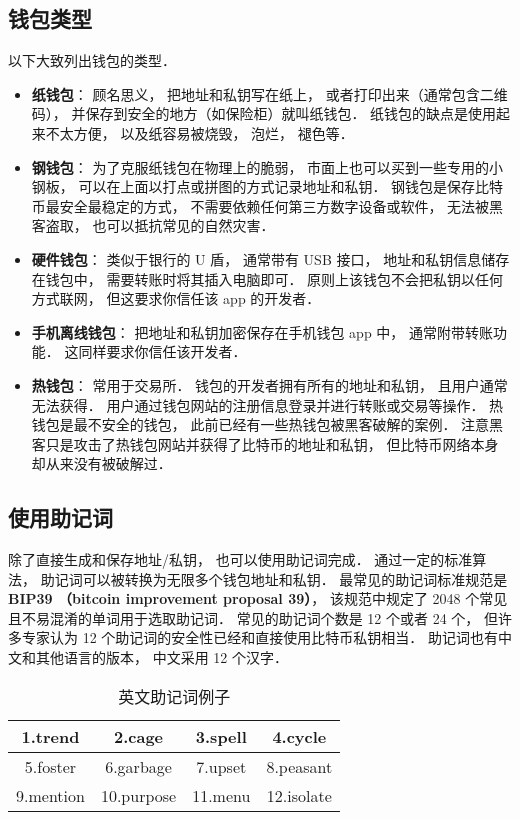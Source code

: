 \subsection{钱包类型}
以下大致列出钱包的类型．
\begin{itemize}
\item \textbf{纸钱包}： 顾名思义， 把地址和私钥写在纸上， 或者打印出来（通常包含二维码）， 并保存到安全的地方（如保险柜）就叫纸钱包． 纸钱包的缺点是使用起来不太方便， 以及纸容易被烧毁， 泡烂， 褪色等．
\item \textbf{钢钱包}： 为了克服纸钱包在物理上的脆弱， 市面上也可以买到一些专用的小钢板， 可以在上面以打点或拼图的方式记录地址和私钥． 钢钱包是保存比特币最安全最稳定的方式， 不需要依赖任何第三方数字设备或软件， 无法被黑客盗取， 也可以抵抗常见的自然灾害．
\item \textbf{硬件钱包}： 类似于银行的 U 盾， 通常带有 USB 接口， 地址和私钥信息储存在钱包中， 需要转账时将其插入电脑即可． 原则上该钱包不会把私钥以任何方式联网， 但这要求你信任该 app 的开发者．
\item \textbf{手机离线钱包}： 把地址和私钥加密保存在手机钱包 app 中， 通常附带转账功能． 这同样要求你信任该开发者．
\item \textbf{热钱包}： 常用于交易所． 钱包的开发者拥有所有的地址和私钥， 且用户通常无法获得． 用户通过钱包网站的注册信息登录并进行转账或交易等操作． 热钱包是最不安全的钱包， 此前已经有一些热钱包被黑客破解的案例． 注意黑客只是攻击了热钱包网站并获得了比特币的地址和私钥， 但比特币网络本身却从来没有被破解过．
\end{itemize}

\subsection{使用助记词}
除了直接生成和保存地址/私钥， 也可以使用助记词完成． 通过一定的标准算法， 助记词可以被转换为无限多个钱包地址和私钥． 最常见的助记词标准规范是 \textbf{BIP39 （bitcoin improvement proposal 39）}， 该规范中规定了 2048 个常见且不易混淆的单词用于选取助记词． 常见的助记词个数是 12 个或者 24 个， 但许多专家认为 12 个助记词的安全性已经和直接使用比特币私钥相当． 助记词也有中文和其他语言的版本， 中文采用 12 个汉字．
\begin{table}[ht]
\centering
\caption{英文助记词例子}\label{CryWal_tab1}
\begin{tabular}{|c|c|c|c|}
\hline
1.trend & 2.cage & 3.spell & 4.cycle \\
\hline
5.foster & 6.garbage & 7.upset & 8.peasant \\
\hline
9.mention & 10.purpose & 11.menu & 12.isolate \\
\hline
\end{tabular}
\end{table}

